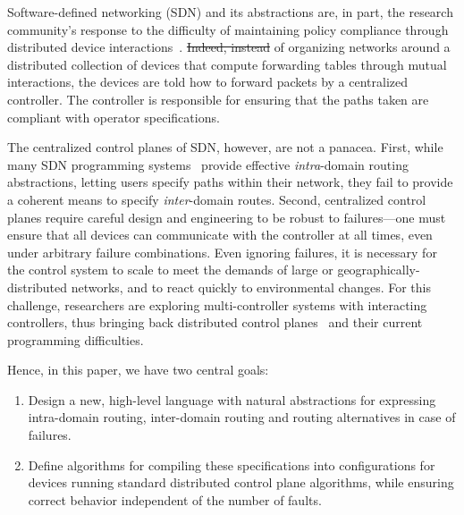 \documentclass[10pt]{sigalternate052015} %
\providecommand{\DIFadd}[1]{{\protect\color{blue}\uwave{#1}}} %
\providecommand{\DIFdel}[1]{{\protect\color{red}\sout{#1}}}                      %
\providecommand{\DIFaddbegin}{} %
\providecommand{\DIFaddend}{} %
\providecommand{\DIFdelbegin}{} %
\providecommand{\DIFdelend}{} %
\begin{document}
Software-defined networking (SDN) and its abstractions
are, in part, the research
community's response to the difficulty of maintaining policy
compliance through distributed device interactions~\cite{ethane}. 
\DIFdelbegin \DIFdel{Indeed, instead }\DIFdelend \DIFaddbegin \DIFadd{Instead }\DIFaddend of organizing networks around a distributed 
collection of devices that compute forwarding tables through
mutual interactions, the devices are told how to
forward packets by a centralized controller. The controller is responsible for ensuring that the
paths taken are compliant with operator specifications.

The centralized control planes of SDN, however, are not a panacea.
First, while many SDN programming systems~\cite{sdn-languages} provide effective \emph{intra}-domain routing
abstractions, letting users specify paths within their network,
they fail to provide a coherent means to specify \emph{inter}-domain routes.
Second, centralized control planes
require careful design and engineering to be robust to failures---one must ensure that all devices can communicate with the controller at all times, even under arbitrary failure combinations. Even ignoring failures, it is necessary for the control system to
scale to meet the demands of large or geographically-distributed networks,
and to react quickly
to environmental changes. For this challenge, researchers are exploring
multi-controller systems with interacting controllers, thus bringing back distributed
control planes~\cite{mccauley2013extending,onos} and their current programming difficulties.

Hence, in this paper, we have two central goals:
\begin{enumerate}
\item Design a new, high-level language with natural abstractions
for expressing intra-domain routing, inter-domain
routing and routing alternatives in case of failures.
\item Define algorithms for compiling these specifications into
configurations for devices running standard
distributed control plane algorithms, while ensuring correct behavior
independent of the number of faults.
\end{enumerate}
\end{document}
